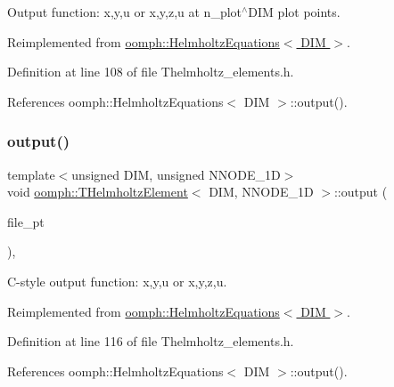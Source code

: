 Output function\+: x,y,u or x,y,z,u at n\+\_\+plot$^\wedge$\+D\+IM plot points. 



Reimplemented from \hyperlink{classoomph_1_1HelmholtzEquations_a63c04aa6b9ee38cb75417b2de9e45f24}{oomph\+::\+Helmholtz\+Equations$<$ D\+I\+M $>$}.



Definition at line 108 of file Thelmholtz\+\_\+elements.\+h.



References oomph\+::\+Helmholtz\+Equations$<$ D\+I\+M $>$\+::output().

\mbox{\label{classoomph_1_1THelmholtzElement_a43d1c573a4c51b9e146d5e9f767ea65c}} 
\subsubsection{\texorpdfstring{output()}{output()}\hspace{0.1cm}{\footnotesize\ttfamily [3/4]}}
{\footnotesize\ttfamily template$<$unsigned D\+IM, unsigned N\+N\+O\+D\+E\+\_\+1D$>$ \\
void \hyperlink{classoomph_1_1THelmholtzElement}{oomph\+::\+T\+Helmholtz\+Element}$<$ D\+IM, N\+N\+O\+D\+E\+\_\+1D $>$\+::output (\begin{DoxyParamCaption}\item[{F\+I\+LE $\ast$}]{file\+\_\+pt }\end{DoxyParamCaption})\hspace{0.3cm}{\ttfamily [inline]}, {\ttfamily [virtual]}}



C-\/style output function\+: x,y,u or x,y,z,u. 



Reimplemented from \hyperlink{classoomph_1_1HelmholtzEquations_a4ff9181e482ccaf3ae94b452e0efa9a1}{oomph\+::\+Helmholtz\+Equations$<$ D\+I\+M $>$}.



Definition at line 116 of file Thelmholtz\+\_\+elements.\+h.



References oomph\+::\+Helmholtz\+Equations$<$ D\+I\+M $>$\+::output().

\mbox{\label{classoomph_1_1THelmholtzElement_a156cee7b91f59f380139ce6551468b2c}} 
